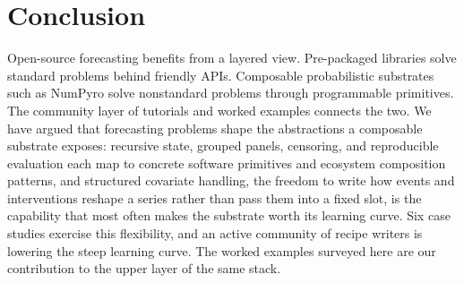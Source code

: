 \documentclass[11pt,3p,review,authoryear]{elsarticle}
\begin{document}
\section{Conclusion}
\label{sec:conclusion}

Open-source forecasting benefits from a layered view. Pre-packaged libraries solve standard problems behind friendly APIs. Composable probabilistic substrates such as NumPyro solve nonstandard problems through programmable primitives. The community layer of tutorials and worked examples connects the two. We have argued that forecasting problems shape the abstractions a composable substrate exposes: recursive state, grouped panels, censoring, and reproducible evaluation each map to concrete software primitives and ecosystem composition patterns, and structured covariate handling, the freedom to write how events and interventions reshape a series rather than pass them into a fixed slot, is the capability that most often makes the substrate worth its learning curve. Six case studies exercise this flexibility, and an active community of recipe writers is lowering the steep learning curve. The worked examples surveyed here are our contribution to the upper layer of the same stack.


%


{\small

}
\end{document}
